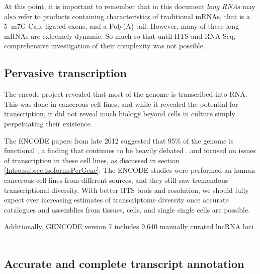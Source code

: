   At this point, it is important to remember that in this document \textit{long RNAs} may also refer to products containing characteristics of traditional mRNAs, that is a 5\textprime~m7G Cap, ligated exons, and a Poly(A) tail. However, many of these long mRNAs are extremely dynamic. So much so that until HTS and RNA-Seq, comprehensive investigation of their complexity was not possible.

  \subsection{Pervasive transcription}
    \label{Disc:subsec:Pervasive Tx}

    The encode project revealed that most of the genome is transcribed into RNA. This was done in cancerous cell lines, and while it revealed the potential for transcription, it did not reveal much biology beyond cells in culture simply perpetuating their existence. 

    
    The ENCODE papers from late 2012 suggested that 95\% of the genome is functional \citep{Dunham2012}, a finding that continues to be heavily debated \citep{Graur2013,Bhattacharjee2014}. \citet{Djebali2012} and focused on issues of transcription in these cell lines, as discussed in section \ref{Intro:subsec:IsoformsPerGene}. The ENCODE studies were performed an human cancerous cell lines from different sources, and they still saw tremendous transcriptional diversity. With better HTS tools and resolution, we should fully expect ever increasing estimates of transcriptome diversity once accurate catalogues and assemblies from tissues, cells, and single single cells are possible.

    Additionally, GENCODE version 7 includes 9,640 manually curated lncRNA loci \citep{Derrien2012}. 

  \subsection{Accurate and complete transcript annotation}
    \label{Disc:subsec:Accurate and complete Tx annotation}

